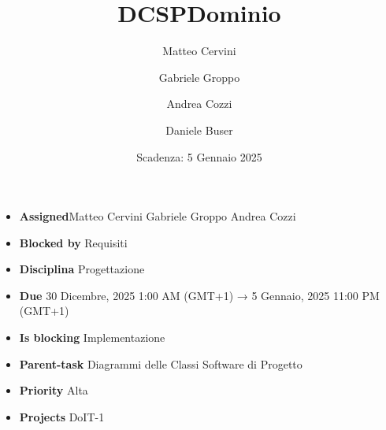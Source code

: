 \title{DCSPDominio}
\author{Matteo Cervini \and Gabriele Groppo \and Andrea Cozzi \and Daniele Buser}
\date{Scadenza: 5 Gennaio 2025}

\maketitle

\begin{itemize}
    \item \textbf{Assigned}Matteo Cervini Gabriele Groppo Andrea Cozzi
    \item \textbf{Blocked by} Requisiti
    \item \textbf{Disciplina} Progettazione
    \item \textbf{Due} 30 Dicembre, 2025 1:00 AM (GMT+1) → 5 Gennaio, 2025 11:00 PM (GMT+1)
    \item \textbf{Is blocking} Implementazione
    \item \textbf{Parent-task} Diagrammi delle Classi Software di Progetto
    \item \textbf{Priority} Alta
    \item \textbf{Projects} DoIT-1
\end{itemize}
